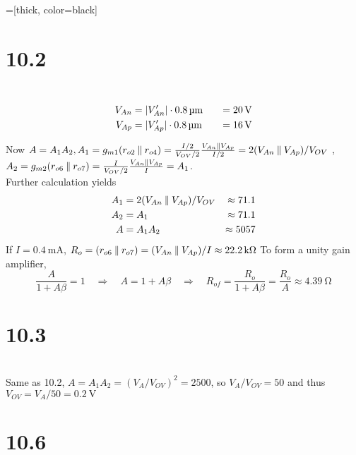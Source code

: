 \documentclass[12pt, a4paper]{article}
\title{} %
\author{} %
\date{} %
\begin{document}
=[thick, color=black]

\section{10.2}

\Ans \\
\begin{alignat*}{3}
  V_{An} &= \abs{V_{An}'} \cdot \SI{0.8}\um \quad &= \SI{20}{V} \\
  V_{Ap} &= \abs{V_{Ap}'} \cdot \SI{0.8}\um &= \SI{16}{V} 
\end{alignat*}

Now $A = A_1 A_2, A_1 = g_{m1} (r_{o2} \mathbin{\|} r_{o4}) = \frac{I/2}{V_{OV}/2} \frac{V_{An} \mathbin{\|} V_{Ap} }{I/2}
= 2 (V_{An} \mathbin{\|} V_{Ap}) / V_{OV}$ , \\
$A_2 = g_{m2} (r_{o6} \mathbin{\|} r_{o7}) = \frac{I}{V_{OV}/2} \frac{V_{An} \mathbin{\|} V_{Ap} }{I} = A_1$. \\
Further calculation yields
\begin{alignat*}{3}
  A_1 &= 2 (V_{An} \mathbin{\|} V_{Ap}) / V_{OV} &\approx 71.1\\
  A_2 &= A_1 &\approx 71.1\\
  A &= A_1 A_2 &\approx 5057\\
\end{alignat*}
If $I = \SI{0.4}\mA$, $R_o = (r_{o6} \paral r_{o7}) = (V_{An} \paral V_{Ap} )/I \approx \SI{22.2}\kohm$
To form a unity gain amplifier, 
\[ \frac{A}{1 + A \beta} = 1 \quad \Rightarrow \quad A = 1 + A \beta \quad \Rightarrow \quad R_{of} = 
\frac{R_o}{1 + A \beta} = \frac{R_o}{A} \approx \SI{4.39}\ohm \]

\section{10.3}

\Ans \\
Same as 10.2, $A = A_1 A_2 = (V_A/V_{OV})^2 = 2500$, so $V_A/V_{OV} = 50$ and thus 
$V_{OV} = V_{A} / 50 = \SI{0.2}\V$

\section{10.6}
\end{document}
